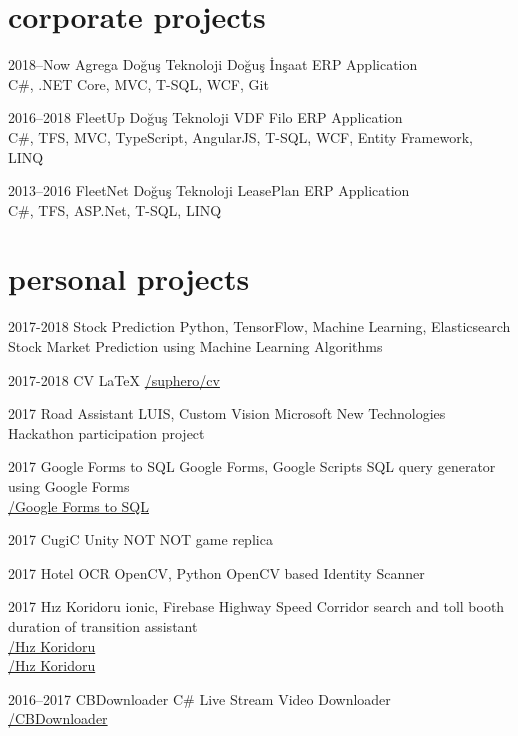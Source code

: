 \documentclass[]{../friggeri-cv} %
\begin{document}
\section{corporate projects}

\begin{entrylist}

\entry
{2018--Now}
{Agrega}
{Doğuş Teknoloji}
{Doğuş İnşaat ERP Application
\\C\#, .NET Core, MVC, T-SQL, WCF, Git}

\entry
{2016--2018}
{FleetUp}
{Doğuş Teknoloji}
{VDF Filo ERP Application
\\C\#, TFS, MVC, TypeScript, AngularJS, T-SQL, WCF, Entity Framework, LINQ}

\entry
{2013--2016}
{FleetNet}
{Doğuş Teknoloji}
{LeasePlan ERP Application
\\C\#, TFS, ASP.Net, T-SQL, LINQ}

\end{entrylist}

\section{personal projects}

\begin{entrylist}

\entry
{2017-2018}
{Stock Prediction}
{Python, TensorFlow, Machine Learning, Elasticsearch}
{Stock Market Prediction using Machine Learning Algorithms}

\entry
{2017-2018}
{CV}
{\LaTeX}
{\href{https://github.com/suphero/cv}{\faGithub/suphero/cv}}

\entry
{2017}
{Road Assistant}
{LUIS, Custom Vision}
{Microsoft New Technologies Hackathon participation project}

\entry
{2017}
{Google Forms to SQL}
{Google Forms, Google Scripts}
{SQL query generator using Google Forms
\\\href{https://github.com/suphero/Google-Forms-to-SQL}{\faGithub/Google Forms to SQL}}

\entry
{2017}
{CugiC}
{Unity}
{NOT NOT game replica}

\entry
{2017}
{Hotel OCR}
{OpenCV, Python}
{OpenCV based Identity Scanner}

\entry
{2017}
{Hız Koridoru}
{ionic, Firebase}
{Highway Speed Corridor search and toll booth duration of transition assistant
\\\href{https://play.google.com/store/apps/details?id=com.harunsokullu.speedcorridor}{\faAndroid/Hız Koridoru}
\\\href{https://itunes.apple.com/tr/app/h\%C4\%B1z-koridoru/id1265151812}{\faApple/Hız Koridoru}}

\entry
{2016--2017}
{CBDownloader}
{C\#}
{Live Stream Video Downloader
\\\href{https://github.com/suphero/CBDownloader}{\faGithub/CBDownloader}}

\end{entrylist}
\end{document}

